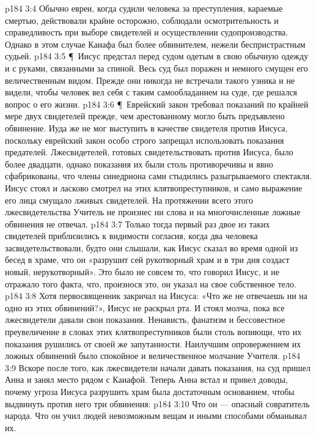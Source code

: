 \vs p184 3:4 Обычно евреи, когда судили человека за преступления, караемые смертью, действовали крайне осторожно, соблюдали осмотрительность и справедливость при выборе свидетелей и осуществлении судопроизводства. Однако в этом случае Каиафа был более обвинителем, нежели беспристрастным судьей.
\vs p184 3:5 \P\ Иисус предстал перед судом одетым в свою обычную одежду и с руками, связанными за спиной. Весь суд был поражен и немного смущен его величественным видом. Прежде они никогда не встречали такого узника и не видели, чтобы человек вел себя с таким самообладанием на суде, где решался вопрос о его жизни.
\vs p184 3:6 \P\ Еврейский закон требовал показаний по крайней мере двух свидетелей прежде, чем арестованному могло быть предъявлено обвинение. Иуда же не мог выступить в качестве свидетеля против Иисуса, поскольку еврейский закон особо строго запрещал использовать показания предателей. Лжесвидетелей, готовых свидетельствовать против Иисуса, было более двадцати, однако показания их были столь противоречивы и явно сфабрикованы, что члены синедриона сами стыдились разыгрываемого спектакля. Иисус стоял и ласково смотрел на этих клятвопреступников, и само выражение его лица смущало лживых свидетелей. На протяжении всего этого лжесвидетельства Учитель не произнес ни слова и на многочисленные ложные обвинения не отвечал.
\vs p184 3:7 Только тогда первый раз двое из таких свидетелей приблизились к видимости согласия, когда два человека засвидетельствовали, будто они слышали, как Иисус сказал во время одной из бесед в храме, что он «разрушит сей рукотворный храм и в три дня создаст новый, нерукотворный». Это было не совсем то, что говорил Иисус, и не отражало того факта, что, произнося это, он указал на свое собственное тело.
\vs p184 3:8 Хотя первосвященник закричал на Иисуса: «Что же не отвечаешь ни на одно из этих обвинений?», Иисус не раскрыл рта. И стоял молча, пока все лжесвидетели давали свои показания. Ненависть, фанатизм и бессовестное преувеличение в словах этих клятвопреступников были столь вопиющи, что их показания рушились от своей же запутанности. Наилучшим опровержением их ложных обвинений было спокойное и величественное молчание Учителя.
\vs p184 3:9 Вскоре после того, как лжесвидетели начали давать показания, на суд пришел Анна и занял место рядом с Каиафой. Теперь Анна встал и привел доводы, почему угроза Иисуса разрушить храм была достаточным основанием, чтобы выдвинуть против него три обвинения:
\vs p184 3:10 \bibnobreakspace Что он --- опасный совратитель народа. Что он учил людей невозможным вещам и иными способами обманывал их.
